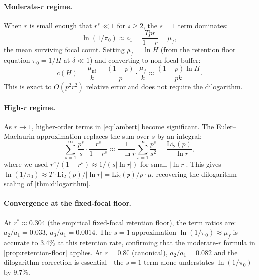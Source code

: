 \documentclass[11pt]{article}
\theoremstyle{plain}
\theoremstyle{definition}
\theoremstyle{remark}
\begin{document}
\paragraph{Moderate-$r$ regime.}
When $r$ is small enough that $r^s \ll 1$ for $s \ge 2$, the $s = 1$
term dominates:
\[
  \ln(1/\pi_0) \approx a_1 = \frac{Tpr}{1-r} = \mu_f,
\]
the mean surviving focal count.  Setting $\mu_f = \ln H$ (from the
retention floor equation $\pi_0 = 1/H$ at $\delta \ll 1$) and
converting to non-focal buffer:
\[
  c(H) = \frac{\mu_{\mathrm{nf}}}{k}
  = \frac{(1-p)}{p} \cdot \frac{\mu_f}{k}
  \approx \frac{(1-p) \ln H}{pk}.
\]
This is exact to $O(p^2 r^2)$ relative error and does not require the
dilogarithm.

\paragraph{High-$r$ regime.}
As $r \to 1$, higher-order terms in \eqref{eq:lambert} become
significant.  The Euler--Maclaurin approximation replaces the sum over
$s$ by an integral:
\[
  \sum_{s=1}^{\infty} \frac{p^s}{s} \cdot \frac{r^s}{1-r^s}
  \approx \frac{1}{-\ln r}
  \sum_{s=1}^{\infty} \frac{p^s}{s^2}
  = \frac{\mathrm{Li}_2(p)}{-\ln r},
\]
where we used $r^s/(1-r^s) \approx 1/(s|\ln r|)$ for small
$|\ln r|$.  This gives $\ln(1/\pi_0) \approx T \cdot
\mathrm{Li}_2(p)/|\ln r| = \mathrm{Li}_2(p)/p \cdot \mu$, recovering
the dilogarithm scaling of \cref{thm:dilogarithm}.

\paragraph{Convergence at the fixed-focal floor.}
At $r^* \approx 0.304$ (the empirical fixed-focal retention floor),
the term ratios are: $a_2/a_1 = 0.033$, $a_3/a_1 = 0.0014$.  The
$s = 1$ approximation $\ln(1/\pi_0) \approx \mu_f$ is accurate to
$3.4\%$ at this retention rate, confirming that the moderate-$r$
formula in \cref{prop:retention-floor} applies.  At $r = 0.80$
(canonical), $a_2/a_1 = 0.082$ and the dilogarithm correction is
essential---the $s = 1$ term alone understates $\ln(1/\pi_0)$ by
$9.7\%$.
\end{document}
